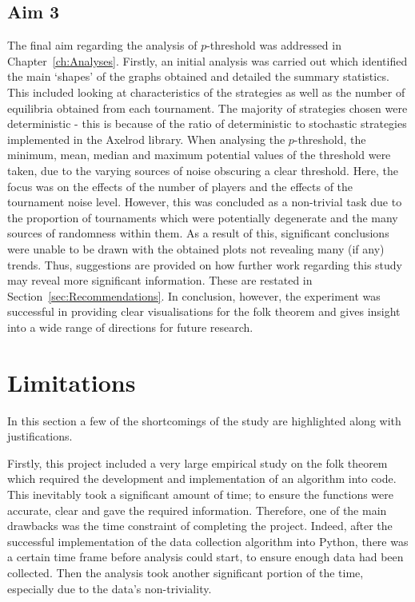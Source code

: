 \subsection{Aim 3}\label{subsec:Aim_3_concl}
The final aim regarding the analysis of \(p\)-threshold was addressed in
Chapter~\ref{ch:Analyses}. Firstly, an initial analysis was carried out which
identified the main `shapes' of the graphs obtained and detailed the summary
statistics. This included looking at characteristics of the strategies as well
as the number of equilibria obtained from each tournament. The majority of
strategies chosen were deterministic - this is because of the ratio of
deterministic to stochastic strategies implemented in the Axelrod library. When
analysing the \(p\)-threshold, the minimum, mean, median and maximum potential
values of the threshold were taken, due to the varying sources of noise
obscuring a clear threshold. Here, the focus was on the effects of the number
of players and the effects of the tournament noise level. However, this was
concluded as a non-trivial task due to the proportion of tournaments which were
potentially degenerate and the many sources of randomness within them. As a
result of this, significant conclusions were unable to be drawn with the
obtained plots not revealing many (if any) trends. Thus, suggestions are
provided on how further work regarding this study may reveal more significant
information. These are restated in Section~\ref{sec:Recommendations}. In
conclusion, however, the experiment was successful in providing clear
visualisations for the folk theorem and gives insight into a wide range of
directions for future research.

\section{Limitations}\label{sec:Limitations}
In this section a few of the shortcomings of the study are highlighted along
with justifications.

Firstly, this project included a very large empirical study on the folk theorem
which required the development and implementation of an algorithm into code.
This inevitably took a significant amount of time; to ensure the functions were
accurate, clear and gave the required information. Therefore, one of the main
drawbacks was the time constraint of completing the project. Indeed, after the
successful implementation of the data collection algorithm into Python, there
was a certain time frame before analysis could start, to ensure enough data had
been collected. Then the analysis took another significant portion of the time,
especially due to the data's non-triviality.

